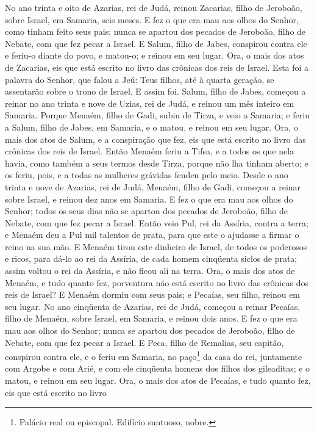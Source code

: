 No ano trinta e oito de Azarias, rei de Judá, reinou Zacarias,
filho de Jeroboão, sobre Israel, em Samaria, seis meses. E fez o
que era mau aos olhos do Senhor, como tinham feito seus pais; nunca
se apartou dos pecados de Jeroboão, filho de Nebate, com que fez
pecar a Israel. E Salum, filho de Jabes, conspirou contra ele
e feriu-o diante do povo, e matou-o; e reinou em seu lugar.
Ora, o mais dos atos de Zacarias, eis que está escrito no
livro das crônicas dos reis de Israel. Esta foi a palavra do
Senhor, que falou a Jeú: Teus filhos, até à quarta geração, se
assentarão sobre o trono de Israel. E assim foi. Salum, filho
de Jabes, começou a reinar no ano trinta e nove de Uzias, rei de
Judá, e reinou um mês inteiro em Samaria. Porque Menaém,
filho de Gadi, subiu de Tirza, e veio a Samaria; e feriu a Salum,
filho de Jabes, em Samaria, e o matou, e reinou em seu lugar.
Ora, o mais dos atos de Salum, e a conspiração que fez, eis
que está escrito no livro das crônicas dos reis de Israel.
Então Menaém feriu a Tifsa, e a todos os que nela havia, como
também a seus termos desde Tirza, porque não lha tinham aberto; e os
feriu, pois, e a todas as mulheres grávidas fendeu pelo meio.
Desde o ano trinta e nove de Azarias, rei de Judá, Menaém,
filho de Gadi, começou a reinar sobre Israel, e reinou dez anos em
Samaria. E fez o que era mau aos olhos do Senhor; todos os
seus dias não se apartou dos pecados de Jeroboão, filho de Nebate,
com que fez pecar a Israel. Então veio Pul, rei da Assíria,
contra a terra; e Menaém deu a Pul mil talentos de prata, para que
este o ajudasse a firmar o reino na sua mão. E Menaém tirou
este dinheiro de Israel, de todos os poderosos e ricos, para dá-lo
ao rei da Assíria, de cada homem cinqüenta siclos de prata; assim
voltou o rei da Assíria, e não ficou ali na terra. Ora, o
mais dos atos de Menaém, e tudo quanto fez, porventura não está
escrito no livro das crônicas dos reis de Israel? E Menaém
dormiu com seus pais; e Pecaías, seu filho, reinou em seu lugar.
No ano cinqüenta de Azarias, rei de Judá, começou a reinar
Pecaías, filho de Menaém, sobre Israel, em Samaria, e reinou dois
anos. E fez o que era mau aos olhos do Senhor; nunca se
apartou dos pecados de Jeroboão, filho de Nebate, com que fez pecar
a Israel. E Peca, filho de Remalias, seu capitão, conspirou
contra ele, e o feriu em Samaria, no paço\footnote{Palácio real ou
episcopal. Edifício suntuoso, nobre.} da casa do rei, juntamente com
Argobe e com Arié, e com ele cinqüenta homens dos filhos dos
gileaditas; e o matou, e reinou em seu lugar. Ora, o mais dos
atos de Pecaías, e tudo quanto fez, eis que está escrito no livro
